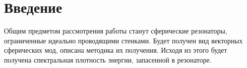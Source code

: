 %
%
%
%
%
%

\section{Введение}

    Общим предметом рассмотрения работы станут сферические резонаторы, ограниченные идеально проводящими стенками. Будет получен вид векторных сферических мод, описана методика их получения. Исходя из этого будет получена спектральная плотность энергии, запасенной в резонаторе.
